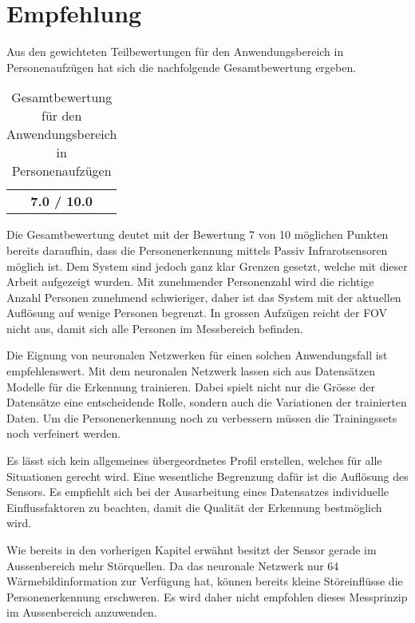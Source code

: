  \newpage

\section{Empfehlung}
\label{sec:Empfehlung}

Aus den gewichteten Teilbewertungen für den Anwendungsbereich in Personenaufzügen hat sich die nachfolgende Gesamtbewertung ergeben.

\begin{table}[H]
	\centering
	\caption[Gesamtbewertung für den Anwendungsbereich in Personenaufzügen]{Gesamtbewertung für den Anwendungsbereich in Personenaufzügen}
	\label{tab:Gesamtbewertung}
	\begin{tabular}{|c|}
		\hline
		\rowcolor[HTML]{9B9B9B} 
		\multicolumn{1}{|c|}{\cellcolor[HTML]{9B9B9B}\textbf{Gesamtbewertung}} \\ \hline
		\textbf{7.0 / 10.0 }                                                                   \\ \hline
	\end{tabular}
\end{table} 

Die Gesamtbewertung deutet mit der Bewertung 7 von 10 möglichen Punkten bereits daraufhin, dass die Personenerkennung mittels Passiv Infrarotsensoren möglich ist. Dem System sind jedoch ganz klar Grenzen gesetzt, welche mit dieser Arbeit aufgezeigt wurden. Mit zunehmender Personenzahl wird die richtige Anzahl Personen zunehmend schwieriger, daher ist das System mit der aktuellen Auflösung auf wenige Personen begrenzt. In grossen Aufzügen reicht der \ac{FOV} nicht aus, damit sich alle Personen im Messbereich befinden.

Die Eignung von neuronalen Netzwerken für einen solchen Anwendungsfall ist empfehlenswert. Mit dem neuronalen Netzwerk lassen sich aus Datensätzen Modelle für die Erkennung trainieren. Dabei spielt nicht nur die Grösse der Datensätze eine entscheidende Rolle, sondern auch die Variationen der trainierten Daten. Um die Personenerkennung noch zu verbessern müssen die Trainingssets noch verfeinert werden. 

Es lässt sich kein allgemeines übergeordnetes Profil erstellen, welches für alle Situationen gerecht wird. Eine wesentliche Begrenzung dafür ist die Auflösung des Sensors. Es empfiehlt sich bei der Ausarbeitung eines Datensatzes individuelle Einflussfaktoren zu beachten, damit die Qualität der Erkennung bestmöglich wird. 

Wie bereits in den vorherigen Kapitel erwähnt besitzt der Sensor gerade im Aussenbereich mehr Störquellen. Da das neuronale Netzwerk nur 64 Wärmebildinformation zur Verfügung hat, können bereits kleine Störeinflüsse die Personenerkennung erschweren. Es wird daher nicht empfohlen dieses Messprinzip im Aussenbereich anzuwenden.

